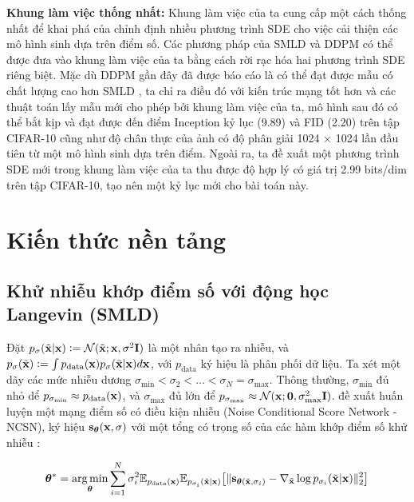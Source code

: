 \documentclass{article} %
\begin{document}
\textbf{Khung làm việc thống nhất:} Khung làm việc của ta cung cấp một cách thống nhất để khai phá của chỉnh định nhiều phương trình SDE cho việc cải thiện các mô hình sinh dựa trên điểm số.
Các phương pháp của SMLD và DDPM có thể được đưa vào khung làm việc của ta bằng cách rời rạc hóa hai phương trình SDE riêng biệt.
Mặc dù DDPM \citep{ho2020denoising} gần đây đã được báo cáo là có thể đạt được mẫu có chất lượng cao hơn SMLD \citep{song2019generative,song2020improved}, ta chỉ ra điều đó với kiến trúc mạng tốt hơn và các thuật toán lấy mẫu mới cho phép bởi khung làm việc của ta, mô hình sau đó có thể bắt kịp và đạt được đến điểm Inception kỷ lục (9.89) và FID (2.20) trên tập CIFAR-10 cũng như độ chân thực của ảnh có độ phân giải 1024 $\times$ 1024 lần đầu tiên từ một mô hình sinh dựa trên điểm.
Ngoài ra, ta đề xuất một phương trình SDE mới trong khung làm việc của ta thu được độ hợp lý có giá trị 2.99 bits/dim trên tập CIFAR-10, tạo nên một kỷ lục mới cho bài toán này.

\section{Kiến thức nền tảng} \label{2}

\subsection{Khử nhiễu khớp điểm số với động học Langevin (SMLD)} \label{2.1}

Đặt $p_{\sigma}(\tilde{\bold{x}} \vert \bold{x}) \vcentcolon = \mathcal{N}(\tilde{\bold{x}};\bold{x}, \sigma^2 \bold{I})$ là một nhân tạo ra nhiễu, và $p_{\sigma}(\tilde{\bold{x}})\vcentcolon = \int p_{\mathrm{data}}(\bold{x}) p_{\sigma}(\tilde{\bold{x}} \vert \bold{x}) d \bold{x}$, với $p_{\mathrm{data}}$ ký hiệu là phân phối dữ liệu.
Ta xét một dãy các mức nhiễu dương $\sigma_{\min} < \sigma_2 < \dots < \sigma_N = \sigma_{\max}$.
Thông thường, $\sigma_{\min}$ đủ nhỏ dể $p_{\sigma_{\min}} \approx p_{\mathrm{data}}(\bold{x})$, và $\sigma_{\max}$ đủ lớn để $p_{\sigma_{\max}}\approx \mathcal{N}(\bold{x}; \bold{0}, \sigma_{\max}^2 \bold{I})$.
\citep{song2019generative} đề xuất huấn luyện một mạng điểm số có điều kiện nhiễu (Noise Conditional Score Network - NCSN), ký hiệu $\bold{s}_{\boldsymbol{\theta}}(\bold{x}, \sigma)$ với một tổng có trọng số của các hàm khớp điểm số khử nhiễu \citep{vincent2011connection}:

\begin{equation} \label{eq:1}
    \boldsymbol{\theta}^{\ast} = \operatorname*{arg\,min}_{\boldsymbol{\theta}} \sum_{i=1}^N \sigma_i^2 \mathbb{E}_{p_{\mathrm{data}}(\bold{x})} \mathbb{E}_{p_{\sigma_i}(\tilde{\bold{x}} \vert \bold{x})} \big\lbrack \lVert \bold{s}_{\boldsymbol{\theta} (\tilde{\bold{x}}, \sigma_i)} - \nabla_{\tilde{\bold{x}}} \log p_{\sigma_i} (\tilde{\bold{x}} \vert \bold{x})  \rVert_2^2 \big\rbrack
\end{equation}
\end{document}
